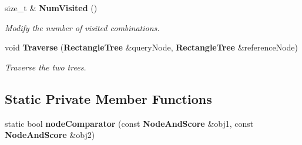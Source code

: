 \begin{DoxyCompactItemize}
size\+\_\+t \& {\bf Num\+Visited} ()
\begin{DoxyCompactList}\small\item\em Modify the number of visited combinations. \end{DoxyCompactList}\item 
void {\bf Traverse} ({\bf Rectangle\+Tree} \&query\+Node, {\bf Rectangle\+Tree} \&reference\+Node)
\begin{DoxyCompactList}\small\item\em Traverse the two trees. \end{DoxyCompactList}\end{DoxyCompactItemize}
\subsection*{Static Private Member Functions}
\begin{DoxyCompactItemize}
\item 
static bool {\bf node\+Comparator} (const {\bf Node\+And\+Score} \&obj1, const {\bf Node\+And\+Score} \&obj2)
\end{DoxyCompactItemize}

